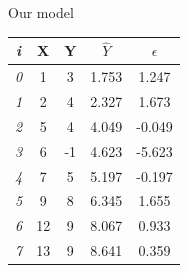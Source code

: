 \documentclass{beamer}
\begin{document}
\begin{frame}
{\centerline{Our model }}


\begin{table}[h!]
\small
  \begin{center}
    \begin{tabular}{|c|c|c|c|c|}      
    \toprule
     \textit{i} & \textbf{X} & \textbf{Y} & \textbf{$\hat{Y}$} & \textbf{$\epsilon$}\\
    \midrule    \midrule
	\textit{0} &1 & 3 & 1.753 & 1.247 \\
	\textit{1} &2 & 4 & 2.327 & 1.673 \\
	\textit{2} &5 & 4  & 4.049 & -0.049\\
	\textit{3} &6 & -1 & 4.623 & -5.623 \\
	\textit{4} &7 & 5  & 5.197 & -0.197\\
	\textit{5} &9 & 8  & 6.345 & 1.655\\
	\textit{6} &12 & 9  & 8.067 & 0.933\\
	\textit{7} &13 & 9  & 8.641 & 0.359\\ \bottomrule
    \end{tabular}
  \end{center}
\end{table}


\end{frame}
\end{document}
